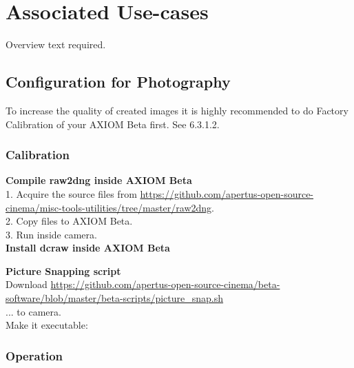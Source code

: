 \section{Associated Use-cases}

Overview text required.




\subsection{Configuration for Photography}

To increase the quality of created images it is highly recommended to do Factory Calibration of your AXIOM Beta first. See 6.3.1.2.\\




\subsubsection{Calibration}

\textbf{Compile raw2dng inside AXIOM Beta}\\

1. Acquire the source files from \href{https://github.com/apertus-open-source-cinema/misc-tools-utilities/tree/master/raw2dng}{https://github.com/apertus-open-source-cinema/misc-tools-utilities/tree/master/raw2dng}.\\
2. Copy files to AXIOM Beta.\\
3. Run  inside camera. \\

\textbf{Install dcraw inside AXIOM Beta}\\

    
\textbf{Picture Snapping script}\\

Download \href{https://github.com/apertus-open-source-cinema/beta-software/blob/master/beta-scripts/picture_snap.sh}{https://github.com/apertus-open-source-cinema/beta-software/blob/master/beta-scripts/picture\_snap.sh}\\ 

... to camera.\\

Make it executable:      




\subsubsection{Operation}


